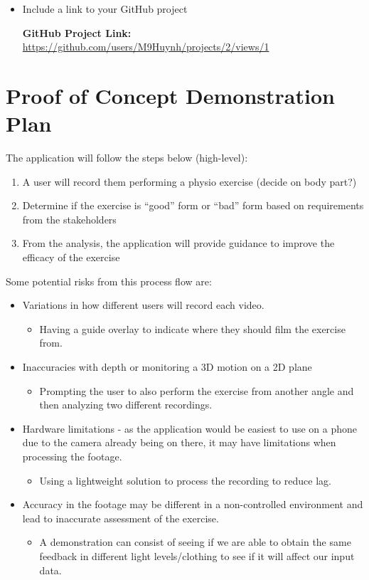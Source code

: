 \documentclass{article}
\begin{document}
\begin{itemize}
 \item Include a link to your GitHub project


 \textbf{GitHub Project Link:} \url{https://github.com/users/M9Huynh/projects/2/views/1}


\end{itemize}




\section{Proof of Concept Demonstration Plan}

The application will follow the steps below (high-level):
\begin{enumerate}
  \item A user will record them performing a physio exercise (decide on body part?)
  \item Determine if the exercise is “good” form or “bad” form based on requirements from the stakeholders
  \item From the analysis, the application will provide guidance to improve the efficacy of the exercise
\end{enumerate}


Some potential risks from this process flow are:
\begin{itemize}
  \item Variations in how different users will record each video.
  \begin{itemize}
    \item Having a guide overlay to indicate where they should film the exercise from.
  \end{itemize}  
  \item Inaccuracies with depth or monitoring a 3D motion on a 2D plane
  \begin{itemize}
    \item Prompting the user to also perform the exercise from another angle and then analyzing two different recordings.
  \end{itemize}
  \item Hardware limitations - as the application would be easiest to use on a phone due to the camera already being on there, it may have limitations when processing the footage.
  \begin{itemize}
    \item Using a lightweight solution to process the recording to reduce lag.
  \end{itemize}
  \item Accuracy in the footage may be different in a non-controlled environment and lead to inaccurate assessment of the exercise. 
  \begin{itemize}
    \item A demonstration can consist of seeing if we are able to obtain the same feedback in different light levels/clothing to see if it will affect our input data.
  \end{itemize} 
\end{itemize}
\end{document}
